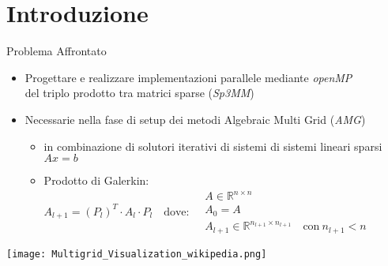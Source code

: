 \section{Introduzione}
\begin{frame}	{Problema Affrontato}
\begin{itemize}
	\item	Progettare e realizzare implementazioni parallele mediante \emph{openMP} \\
			del triplo prodotto tra matrici sparse (\emph{Sp3MM})
	\pause
	\item	Necessarie nella fase di setup dei metodi Algebraic Multi Grid (\emph{AMG})
	\begin{itemize}
		\item	in combinazione di solutori iterativi di sistemi di sistemi lineari sparsi $Ax=b$
		\pause
		\item	Prodotto di Galerkin:\\
			$A_{l+1} = (P_l)^T \cdot A_l \cdot P_l  \quad \text{dove:} ~
			\begin{aligned}  
				& A \in \mathbb{R}^{n \times n} \\  
				& A_0 = A\\  
				& A_{l+1}  \in \mathbb{R}^{n_{l+1} \times n_{l+1}} \quad \text{con}~ n_{l+1}<n \end{aligned} $%
	\end{itemize}
\end{itemize}
\voidLine
\centering
\texttt{[image: Multigrid\_Visualization\_wikipedia.png]}

\end{frame}

